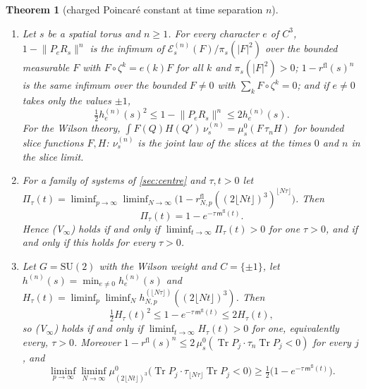 \documentclass[11pt,a4paper]{amsart}
\newtheorem{theorem}{Theorem}[section]
\theoremstyle{definition}
\theoremstyle{remark}
\numberwithin{equation}{section}
\DeclareMathOperator{\Tr}{Tr}        %
\newcommand{\norm}[1]{\lVert #1\rVert}     %
\newcommand{\abs}[1]{\lvert #1\rvert}      %
\newcommand{\SU}{\mathrm{SU}}              %
\newcommand{\cube}[1]{(2#1)^3}             %
\begin{document}
\begin{theorem}[charged Poincar\'e constant at time separation $n$]\label{thm:timed-poincare}
\begin{enumerate}[label=\textup{(\alph*)},leftmargin=*]
\item Let $s$ be a spatial torus and $n\ge1$. For every character $e$ of $C^3$, $1-\norm{P_eR_s}^n$ is the infimum of $\mathcal E^{(n)}_s(F)/\pi_s(\abs F^2)$ over the bounded measurable $F$ with $F\circ\zeta^k=e(k)F$ for all $k$ and $\pi_s(\abs F^2)>0$; $1-r^{\mathrm{fl}}(s)^n$ is the same infimum over the bounded $F\ne0$ with $\sum_kF\circ\zeta^k=0$; and if $e\ne0$ takes only the values $\pm1$,
\begin{equation}\label{eq:timed-cheeger}
\tfrac12h^{(n)}_e(s)^2\le1-\norm{P_eR_s}^n\le2h^{(n)}_e(s).
\end{equation}
For the Wilson theory, $\int F(Q)H(Q')\,\nu^{(n)}_s=\mu^0_s(F\,\tau_nH)$ for bounded slice functions $F,H$: $\nu^{(n)}_s$ is the joint law of the slices at the times $0$ and $n$ in the slice limit.
\item For a family of systems of \cref{sec:centre} and $\tau,t>0$ let $\Pi_\tau(t)=\liminf_{p\to\infty}\liminf_{N\to\infty}\bigl(1-r^{\mathrm{fl}}_{N,p}(\cube{\lfloor Nt\rfloor})^{\lfloor N\tau\rfloor}\bigr)$. Then
\[
\Pi_\tau(t)=1-e^{-\tau\,\mathsf m^{\mathrm{fl}}(t)} .
\]
Hence \textup{(V$_\infty$)} holds if and only if $\liminf_{t\to\infty}\Pi_\tau(t)>0$ for one $\tau>0$, and if and only if this holds for every $\tau>0$.
\item Let $G=\SU(2)$ with the Wilson weight and $C=\{\pm1\}$, let $h^{(n)}(s)=\min_{e\ne0}h^{(n)}_e(s)$ and $H_\tau(t)=\liminf_p\liminf_Nh^{(\lfloor N\tau\rfloor)}_{N,p}(\cube{\lfloor Nt\rfloor})$. Then
\[
\tfrac12H_\tau(t)^2\le1-e^{-\tau\,\mathsf m^{\mathrm{fl}}(t)}\le2H_\tau(t),
\]
so \textup{(V$_\infty$)} holds if and only if $\liminf_{t\to\infty}H_\tau(t)>0$ for one, equivalently every, $\tau>0$. Moreover $1-r^{\mathrm{fl}}(s)^n\le2\,\mu^0_s(\Tr P_j\cdot\tau_n\Tr P_j<0)$ for every $j$, and
\[
\liminf_{p\to\infty}\liminf_{N\to\infty}\mu^0_{\cube{\lfloor Nt\rfloor}}\bigl(\Tr P_j\cdot\tau_{\lfloor N\tau\rfloor}\Tr P_j<0\bigr)\ge\tfrac12\bigl(1-e^{-\tau\,\mathsf m^{\mathrm{fl}}(t)}\bigr).
\]
\end{enumerate}
\end{theorem}
\end{document}
